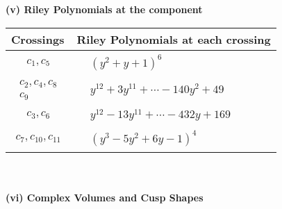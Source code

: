\documentclass[1p]{elsarticle_modified}
\theoremstyle{definition}
\begin{document}
\newpage\renewcommand{\arraystretch}{1}
\flushleft \textbf{(v) Riley Polynomials at the component}\newline \\
\begin{tabular}{m{50pt}|m{274pt}}
Crossings & \hspace{64pt}Riley Polynomials at each crossing \\
\hline $$\begin{aligned}c_{1},c_{5}\end{aligned}$$&$\begin{aligned}
&(y^2+y+1)^6
\end{aligned}$\\
\hline $$\begin{aligned}c_{2},c_{4},c_{8}\\c_{9}\end{aligned}$$&$\begin{aligned}
&y^{12}+3 y^{11}+\cdots-140 y^2+49
\end{aligned}$\\
\hline $$\begin{aligned}c_{3},c_{6}\end{aligned}$$&$\begin{aligned}
&y^{12}-13 y^{11}+\cdots-432 y+169
\end{aligned}$\\
\hline $$\begin{aligned}c_{7},c_{10},c_{11}\end{aligned}$$&$\begin{aligned}
&(y^3-5 y^2+6 y-1)^4
\end{aligned}$\\
\hline
\end{tabular}\\~\\
\newpage\flushleft \textbf{(vi) Complex Volumes and Cusp Shapes}
\end{document}
